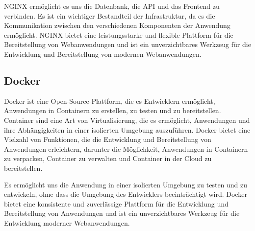 NGINX ermöglicht es uns die Datenbank, die \acs{API} und das Frontend zu verbinden. Es ist ein wichtiger Bestandteil der Infrastruktur, da es die Kommunikation zwischen den verschiedenen Komponenten der Anwendung ermöglicht. \acs{NGINX} bietet eine leistungsstarke und flexible Plattform für die Bereitstellung von Webanwendungen und ist ein unverzichtbares Werkzeug für die Entwicklung und Bereitstellung von modernen Webanwendungen. \cite{nginx}

\subsection{Docker}


Docker ist eine Open-Source-Plattform, die es Entwicklern ermöglicht, Anwendungen in Containern zu erstellen, zu testen und zu bereitstellen. Container sind eine Art von Virtualisierung, die es ermöglicht, Anwendungen und ihre Abhängigkeiten in einer isolierten Umgebung auszuführen. Docker bietet eine Vielzahl von Funktionen, die die Entwicklung und Bereitstellung von Anwendungen erleichtern, darunter die Möglichkeit, Anwendungen in Containern zu verpacken, Container zu verwalten und Container in der Cloud zu bereitstellen.

Es ermöglicht uns die Anwendung in einer isolierten Umgebung zu testen und zu entwickeln, ohne dass die Umgebung des Entwicklers beeinträchtigt wird. Docker bietet eine konsistente und zuverlässige Plattform für die Entwicklung und Bereitstellung von Anwendungen und ist ein unverzichtbares Werkzeug für die Entwicklung moderner Webanwendungen. \cite{docker}